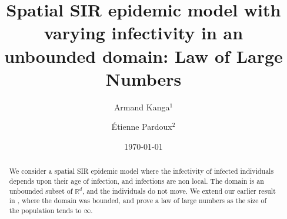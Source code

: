 \documentclass[notitlepage,reqno,11pt]{amsart}
\numberwithin{equation}{section}
\def\R{\mathbb{R}}
\newcommand{\ttl}{\Large Spatial SIR epidemic model with varying infectivity  in an unbounded domain: Law of Large Numbers  }
\begin{document}
\title[]{\ttl}

\author[Armand \ Kanga]{Armand Kanga$^1$}
\address{$^1$Laboratory of Applied Mathematics and Computer Science, Universit{\'e} Felix Houphou{\"e}t-Boigny,  Abidjan, Ivory Coast and Aix--Marseille Universit{\'e}, CNRS, I2M, Marseille, France }
\author[{\'E}tienne \ Pardoux]{{\'E}tienne Pardoux$^2$}
\address{$^2$Aix--Marseille Universit{\'e}, CNRS, I2M, Marseille, France}


\date{\today}

%
%

\maketitle


\allowdisplaybreaks

%
% 

\begin{abstract} 
	We consider a spatial SIR epidemic model where the infectivity of infected individuals depends upon their age of infection, and infections are non local. The domain is an unbounded
	subset of $\R^d$,
	and the individuals do not move. We extend our earlier result in \cite{AK-EP}, where the domain was bounded, and prove a law of large numbers as the size of the population tends to $\infty$.
	\end{abstract}
\end{document}

